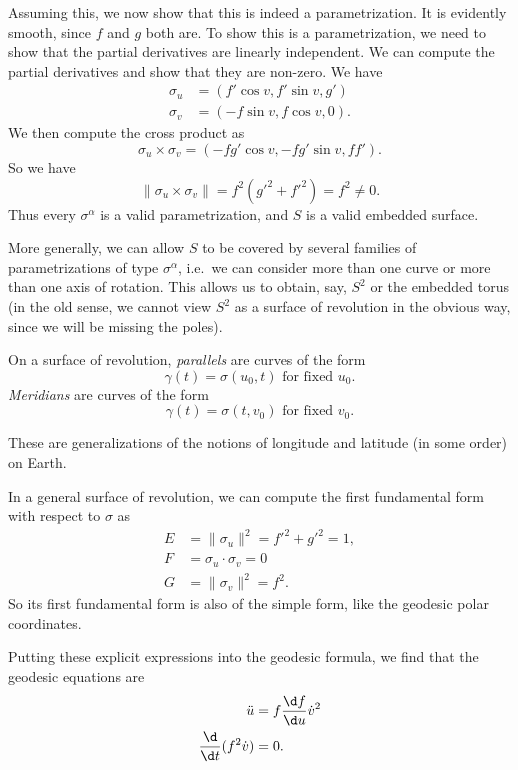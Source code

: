 \documentclass[a4paper]{article}
\begin{document}
Assuming this, we now show that this is indeed a parametrization. It is evidently smooth, since $f$ and $g$ both are. To show this is a parametrization, we need to show that the partial derivatives are linearly independent. We can compute the partial derivatives and show that they are non-zero. We have
\begin{align*}
  \sigma_u &= (f' \cos v, f'\sin v, g')\\
  \sigma_v &= (-f \sin v, f \cos v, 0).
\end{align*}
We then compute the cross product as
\[
  \sigma_u \times \sigma_v = (-fg' \cos v, -fg' \sin v, ff').
\]
So we have
\[
  \|\sigma_u \times \sigma_v\| = f^2 (g'^2 + f'^2) = f^2 \not= 0.
\]
Thus every $\sigma^\alpha$ is a valid parametrization, and $S$ is a valid embedded surface.

More generally, we can allow $S$ to be covered by several families of parametrizations of type $\sigma^\alpha$, i.e.\ we can consider more than one curve or more than one axis of rotation. This allows us to obtain, say, $S^2$ or the embedded torus (in the old sense, we cannot view $S^2$ as a surface of revolution in the obvious way, since we will be missing the poles).

\begin{defi}[Parallels]
  On a surface of revolution, \emph{parallels} are curves of the form
  \[
    \gamma(t) = \sigma(u_0, t)\text{ for fixed }u_0.
  \]
  \emph{Meridians} are curves of the form
  \[
    \gamma(t) = \sigma(t, v_0)\text{ for fixed }v_0.
  \]
\end{defi}
These are generalizations of the notions of longitude and latitude (in some order) on Earth.

In a general surface of revolution, we can compute the first fundamental form with respect to $\sigma$ as
\begin{align*}
  E &= \|\sigma_u\|^2 = f'^2 + g'^2 = 1,\\
  F &= \sigma_u \cdot \sigma_v = 0\\
  G &= \|\sigma_v\|^2 = f^2.
\end{align*}
So its first fundamental form is also of the simple form, like the geodesic polar coordinates.

Putting these explicit expressions into the geodesic formula, we find that the geodesic equations are
\begin{align*}
  \ddot{u} &= f \frac{\d f}{\d u} \dot{v}^2\\
  \frac{\d}{\d t} (f^2 \dot{v}) &= 0.
\end{align*}
\end{document}
